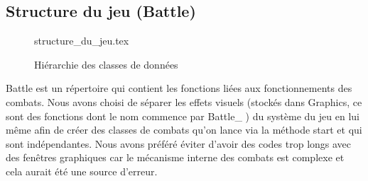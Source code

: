 \newpage

\subsection{Structure du jeu (Battle)}

\begin{figure}[!h]\centering
{structure_du_jeu.tex}
\caption{Hiérarchie des classes de données}
\end{figure}

Battle est un répertoire qui contient les fonctions liées aux fonctionnements des combats. Nous avons choisi de séparer les effets visuels (stockés dans Graphics, ce sont des fonctions dont le nom commence par Battle\_ ) du système du jeu en lui même afin de créer des classes de combats qu’on lance via la méthode start et qui sont indépendantes. Nous avons préféré éviter d’avoir des codes trop longs avec des fenêtres graphiques car le mécanisme interne des combats est complexe et cela aurait été une source d’erreur.

